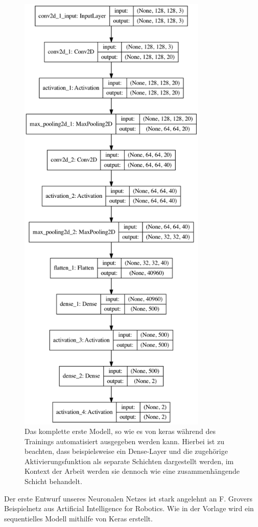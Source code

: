 \documentclass[conference]{IEEEtran}
\begin{document}
	\begin{figure}
		\centering
		\includegraphics[width=9cm]{erstes_modell.png}
		\caption{Das komplette erste Modell, so wie es von keras während des Trainings automatisiert ausgegeben werden kann. Hierbei ist zu beachten, dass beispielsweise ein Dense-Layer und die zugehörige Aktivierungsfunktion als separate Schichten dargestellt werden, im Kontext der Arbeit werden sie dennoch wie eine zusammenhängende Schicht behandelt.}
		\label{erstes Modell: keras-visualisierung}
	\end{figure}

	Der erste Entwurf unseres Neuronalen Netzes ist stark angelehnt an F. Grovers Beispielnetz aus \glqq Artificial Intelligence for Robotics\grqq \cite{govers2018artificial}. 
	Wie in der Vorlage wird ein sequentielles Modell mithilfe von Keras 
	erstellt.
\end{document}
